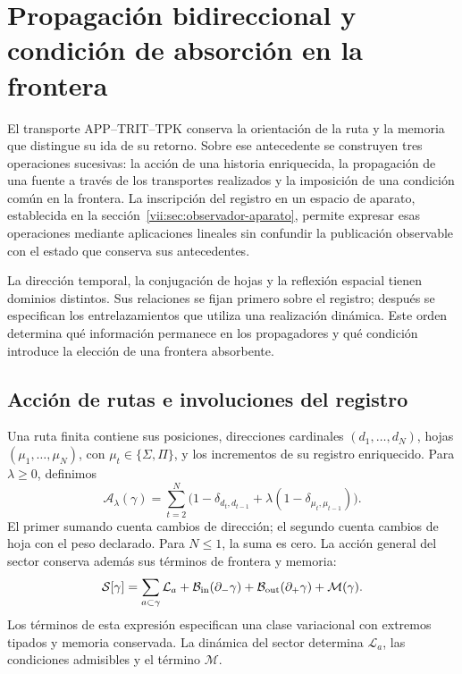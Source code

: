
\section{Propagación bidireccional y condición de absorción en la frontera}
\label{vii:sec:propagacion-bidireccional}

El transporte APP--TRIT--TPK conserva la orientación de la ruta y la memoria
que distingue su ida de su retorno. Sobre ese antecedente se construyen tres
operaciones sucesivas: la acción de una historia enriquecida, la propagación
de una fuente a través de los transportes realizados y la imposición de una
condición común en la frontera. La inscripción del registro en un espacio de
aparato, establecida en la sección~\ref{vii:sec:observador-aparato}, permite
expresar esas operaciones mediante aplicaciones lineales sin confundir la
publicación observable con el estado que conserva sus antecedentes.

La dirección temporal, la conjugación de hojas y la reflexión espacial
tienen dominios distintos. Sus relaciones se fijan primero sobre el registro;
después se especifican los entrelazamientos que utiliza una realización
dinámica. Este orden determina qué información permanece en los propagadores
y qué condición introduce la elección de una frontera absorbente.

\subsection{Acción de rutas e involuciones del registro}
\label{vii:subsec:accion-bidireccional}

Una ruta finita contiene sus posiciones, direcciones cardinales
\((d_1,\ldots,d_N)\), hojas \((\mu_1,\ldots,\mu_N)\), con
\(\mu_t\in\{\Sigma,\Pi\}\), y los incrementos de su registro
enriquecido. Para \(\lambda\geq0\), definimos
\begin{equation}
 \mathcal A_\lambda(\gamma)
 =\sum_{t=2}^N
 \bigl(1-\delta_{d_t,d_{t-1}}
       +\lambda(1-\delta_{\mu_t,\mu_{t-1}})\bigr).
 \label{vii:eq:accion-ruta-bidireccional}
\end{equation}
El primer sumando cuenta cambios de dirección; el segundo cuenta cambios
de hoja con el peso declarado. Para \(N\leq1\), la suma es cero.
La acción general del sector conserva además sus términos de frontera y
memoria:
\begin{equation}
 \mathcal S[\gamma]
 =\sum_{a\subset\gamma}\mathcal L_a
  +\mathcal B_{\rm in}(\partial_-\gamma)
  +\mathcal B_{\rm out}(\partial_+\gamma)
  +\mathcal M(\gamma).
 \label{vii:eq:accion-enriquecida-frontera}
\end{equation}
Los términos de esta expresión especifican una clase variacional con
extremos tipados y memoria conservada. La dinámica del sector determina
\(\mathcal L_a\), las condiciones admisibles y el término \(\mathcal M\).


